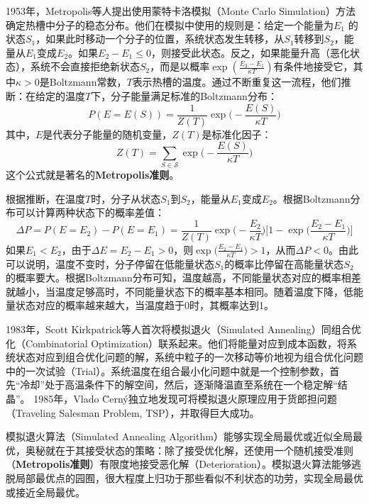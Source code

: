 1953年，Metropolis等人\cite{metropolis1953equation}提出使用蒙特卡洛模拟（Monte Carlo Simulation）方法确定热槽中分子的稳态分布。他们在模拟中使用的规则是：给定一个能量为$E_1$ 的状态$S_1$，如果此时移动一个分子的位置，系统状态发生转移，从$S_1$转移到$S_2$，能量从$E_1$变成$E_2$。如果$E_2 - E_1 \le 0$，则接受此状态。反之，如果能量升高（恶化状态），系统不会直接拒绝新状态$S_2$，而是以概率$\exp(\frac{E_2-E_1}{\kappa T})$有条件地接受它，其中$\kappa>0$是Boltzmann常数，$T$表示热槽的温度。通过不断重复这一流程，他们推断：在给定的温度$T$下，分子能量满足标准的Boltzmann分布：
\begin{equation}
    P(E = E(S)) = \frac{1}{Z(T)} \exp\big(-\frac{E(S)}{\kappa T}\big)
\end{equation}
其中，$E$是代表分子能量的随机变量，$Z(T)$是标准化因子：
\[
    Z(T) = \sum\limits_{S\in \mathcal{S}} \exp\big(-\frac{E(S)}{\kappa T}\big)
\]
这个公式就是著名的\textbf{Metropolis准则}。

根据推断，在温度$T$时，分子从状态$S_1$到$S_2$，能量从$E_1$变成$E_2$。根据Boltzmann分布可以计算两种状态下的概率差值：
\[
    \Delta P = P(E = E_2) - P(E = E_1) = \frac{1}{Z(T)} \exp\big(-\frac{E_2}{\kappa T}\big)\big[1-\exp\big(\frac{E_2 - E_1}{\kappa T}\big)\big]
\]
如果$E_1<E_2$，由于$\Delta E = E_2 - E_1 > 0$，则$\exp\big(\frac{E_2 - E_1}{\kappa T}\big) > 1$，从而$\Delta P < 0$。由此可以说明，温度不变时，分子停留在低能量状态$S_1$的概率比停留在高能量状态$S_2$的概率要大。根据Boltzmann分布可知，温度越高，不同能量状态对应的概率相差就越小，当温度足够高时，不同能量状态下的概率基本相同。随着温度下降，低能量状态对应的概率越来越大，当温度趋于0时，其概率达到1。

1983年，Scott Kirkpatrick等人\cite{kirkpatrick1983optimization}首次将模拟退火（Simulated Annealing）同组合优化（Combinatorial Optimization）联系起来。他们将能量对应到成本函数，将系统状态对应到组合优化问题的解，系统中粒子的一次移动等价地视为组合优化问题中的一次试验（Trial）。系统温度在组合最小化问题中就是一个控制参数，首先“冷却”处于高温条件下的解空间，然后，逐渐降温直至系统在一个稳定解“结晶”。
1985年，Vlado \u{C}ern\'{y}\cite{vcerny1985thermodynamical}独立地发现可将模拟退火原理应用于货郎担问题（Traveling Salesman Problem, TSP），并取得巨大成功。

模拟退火算法（Simulated Annealing Algorithm）能够实现全局最优或近似全局最优，奥秘就在于其接受状态的策略：除了接受优化解，还使用一个随机接受准则（\textbf{Metropolis准则}）有限度地接受恶化解（Deterioration）。模拟退火算法能够逃脱局部最优点的园囿，很大程度上归功于那些看似不利状态的功劳，实现全局最优或接近全局最优。

